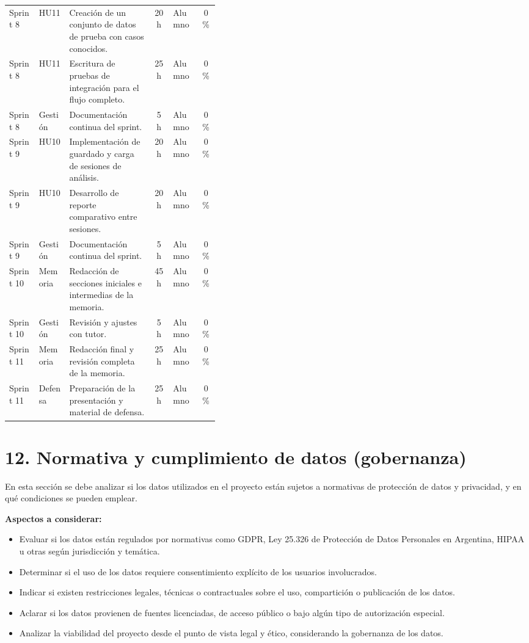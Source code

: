 \documentclass[
11pt, %
]{charter}
\begin{document}
\begin{longtable}{|l|l|p{0.4\linewidth}|c|l|c|}
Sprint 8 & HU11 & Creación de un conjunto de datos de prueba con casos conocidos. & 20 h & Alumno & 0\% \\
Sprint 8 & HU11 & Escritura de pruebas de integración para el flujo completo. & 25 h & Alumno & 0\% \\
Sprint 8 & Gestión & Documentación continua del sprint. & 5 h & Alumno & 0\% \\ \hline

Sprint 9 & HU10 & Implementación de guardado y carga de sesiones de análisis. & 20 h & Alumno & 0\% \\
Sprint 9 & HU10 & Desarrollo de reporte comparativo entre sesiones. & 20 h & Alumno & 0\% \\
Sprint 9 & Gestión & Documentación continua del sprint. & 5 h & Alumno & 0\% \\ \hline

Sprint 10 & Memoria & Redacción de secciones iniciales e intermedias de la memoria. & 45 h & Alumno & 0\% \\
Sprint 10 & Gestión & Revisión y ajustes con tutor. & 5 h & Alumno & 0\% \\ \hline

Sprint 11 & Memoria & Redacción final y revisión completa de la memoria. & 25 h & Alumno & 0\% \\
Sprint 11 & Defensa & Preparación de la presentación y material de defensa. & 25 h & Alumno & 0\% \\

\end{longtable}

\section{12. Normativa y cumplimiento de datos (gobernanza)}

En esta sección se debe analizar si los datos utilizados en el proyecto están sujetos a normativas de protección de datos y privacidad, y en qué condiciones se pueden emplear.

\textbf{Aspectos a considerar:}
\begin{itemize}
  \item Evaluar si los datos están regulados por normativas como GDPR, Ley 25.326 de Protección de Datos Personales en Argentina, HIPAA u otras según jurisdicción y temática.
  \item Determinar si el uso de los datos requiere consentimiento explícito de los usuarios involucrados.
  \item Indicar si existen restricciones legales, técnicas o contractuales sobre el uso, compartición o publicación de los datos.
  \item Aclarar si los datos provienen de fuentes licenciadas, de acceso público o bajo algún tipo de autorización especial.
  \item Analizar la viabilidad del proyecto desde el punto de vista legal y ético, considerando la gobernanza de los datos.
\end{itemize}
\end{document}
